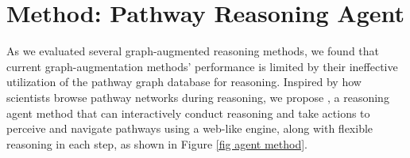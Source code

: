 \section{Method: Pathway Reasoning Agent \modelname}

\begin{figure*}[!t]
    \centering    
    \renewcommand{\thesubfigure}{} %
    \vspace{-2mm}
    \caption{\modelname allows interactive browsing of the pathway graph database by navigating through subgraphs. At each step, \modelname can perform either a global subgraph search or a local search around a previously explored pathway step. This functionality enables \modelname to fully leverage the augmented pathway graph database during biological pathway reasoning.}
    \label{fig agent method}
    \vspace{-2mm}
\end{figure*}

As we evaluated several graph-augmented reasoning methods, we found that current graph-augmentation methods' performance is limited by their ineffective utilization of the pathway graph database for reasoning. Inspired by how scientists browse pathway networks during reasoning, we propose \modelname, a reasoning agent method that can interactively conduct reasoning and take actions to perceive and navigate pathways using a web-like engine, along with flexible reasoning in each step, as shown in Figure \ref{fig agent method}.




